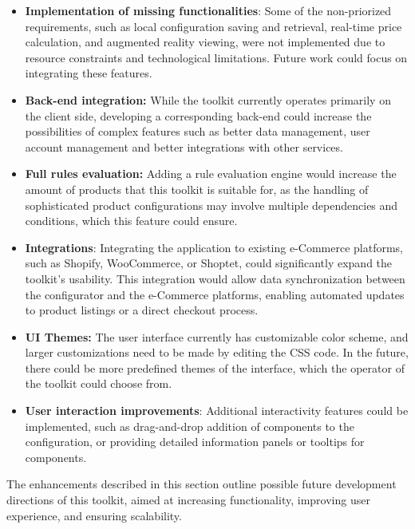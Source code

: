 \begin{itemize}[label=\rectanglebullet]
    \item \textbf{Implementation of missing functionalities}: Some of the non-priorized requirements, such as local configuration saving and retrieval, real-time price calculation, and augmented reality viewing, were not implemented due to resource constraints and technological limitations. Future work could focus on integrating these features.
    \item \textbf{Back-end integration:} While the toolkit currently operates primarily on the client side, developing a corresponding back-end could increase the possibilities of complex features such as better data management, user account management and better integrations with other services.
    \item \textbf{Full rules evaluation:} Adding a rule evaluation engine would increase the amount of products that this toolkit is suitable for, as the handling of sophisticated product configurations may involve multiple dependencies and conditions, which this feature could ensure.
    \item \textbf{Integrations}: Integrating the application to existing e-Commerce platforms, such as Shopify, WooCommerce, or Shoptet, could significantly expand the toolkit's usability. This integration would allow data synchronization between the configurator and the e-Commerce platforms, enabling automated updates to product listings or a direct checkout process.
    \item \textbf{UI Themes:} The user interface currently has customizable color scheme, and larger customizations need to be made by editing the CSS code. In the future, there could be more predefined themes of the interface, which the operator of the toolkit could choose from.
    \item \textbf{User interaction improvements}: Additional interactivity features could be implemented, such as drag-and-drop addition of components to the configuration, or providing detailed information panels or tooltips for components.
\end{itemize}

The enhancements described in this section outline possible future development directions of this toolkit, aimed at increasing functionality, improving user experience, and ensuring scalability.